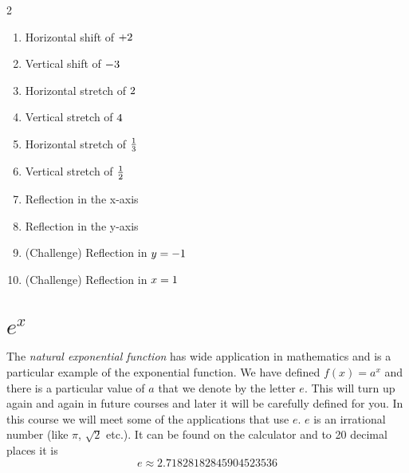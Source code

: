 \columnseprule =0.4pt
\begin {multicols}{2}

\begin{enumerate}
\item Horizontal shift of $ +2\vspace{+2.000000cm}$ 

\item Vertical shift of $ -3\vspace{+2.000000cm}$ 

\item Horizontal stretch of $2\vspace{+2.000000cm}$ 

\item Vertical stretch of $4\vspace{+2.000000cm}$ 

\item Horizontal stretch of $\frac{1}{3}\vspace{+2.000000cm}$ 

\item Vertical stretch of $\frac{1}{2}\vspace{+2.000000cm}$ 

\item Reflection in the x-axis\vspace{2cm}


\item Reflection in the y-axis\vspace{2cm} 

\item (Challenge) Reflection in $y = -1\vspace{+2.000000cm}$ 

\item (Challenge) Reflection in $x =1\vspace{+2.000000cm}$ \end{enumerate}

\end {multicols}


\section{\ensuremath{e^x}}

The \emph{natural exponential function} has wide application in mathematics and is a particular example of the exponential
function. We have defined $f (x) =a^{x}$ and there is a particular value of $a$ that we denote by the letter $e$. This will turn up again and again in future courses and later it will be carefully
defined for you. In this course we will meet some of the applications that use $e$. $e$ is an irrational number (like $\pi $, $\sqrt{2}$ etc.). It can be found on the calculator and to 20 decimal places it is
\begin{equation*}e \approx 2.71828182845904523536
\end{equation*}

